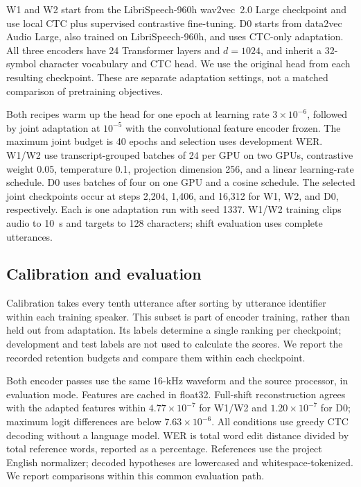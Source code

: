 \documentclass{article}
\begin{document}
W1 and W2 start from the LibriSpeech-960h wav2vec~2.0 Large checkpoint and use local CTC plus supervised contrastive fine-tuning. D0 starts from data2vec Audio Large, also trained on LibriSpeech-960h, and uses CTC-only adaptation. All three encoders have 24 Transformer layers and $d=1024$, and inherit a 32-symbol character vocabulary and CTC head. We use the original head from each resulting checkpoint. These are separate adaptation settings, not a matched comparison of pretraining objectives.

Both recipes warm up the head for one epoch at learning rate $3\times10^{-6}$, followed by joint adaptation at $10^{-5}$ with the convolutional feature encoder frozen. The maximum joint budget is 40 epochs and selection uses development WER. W1/W2 use transcript-grouped batches of 24 per GPU on two GPUs, contrastive weight 0.05, temperature 0.1, projection dimension 256, and a linear learning-rate schedule. D0 uses batches of four on one GPU and a cosine schedule. The selected joint checkpoints occur at steps 2,204, 1,406, and 16,312 for W1, W2, and D0, respectively. Each is one adaptation run with seed 1337. W1/W2 training clips audio to 10~s and targets to 128 characters; shift evaluation uses complete utterances.

\subsection{Calibration and evaluation}
Calibration takes every tenth utterance after sorting by utterance identifier within each training speaker. This subset is part of encoder training, rather than held out from adaptation. Its labels determine a single ranking per checkpoint; development and test labels are not used to calculate the scores. We report the recorded retention budgets and compare them within each checkpoint.

Both encoder passes use the same 16-kHz waveform and the source processor, in evaluation mode. Features are cached in float32. Full-shift reconstruction agrees with the adapted features within $4.77\times10^{-7}$ for W1/W2 and $1.20\times10^{-7}$ for D0; maximum logit differences are below $7.63\times10^{-6}$. All conditions use greedy CTC decoding without a language model. WER is total word edit distance divided by total reference words, reported as a percentage. References use the project English normalizer; decoded hypotheses are lowercased and whitespace-tokenized. We report comparisons within this common evaluation path.
\end{document}
